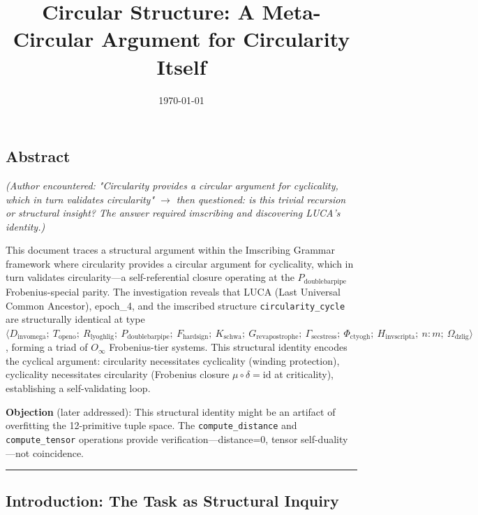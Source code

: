 \documentclass[12pt,a4paper]{article}
\begin{document}
\title{Circular Structure: A Meta-Circular Argument for Circularity Itself}
\date{\today}

\maketitle

\subsection{Abstract}

\emph{(Author encountered: "Circularity provides a circular argument for cyclicality, which in turn validates circularity" $\rightarrow$ then questioned: is this trivial recursion or structural insight? The answer required imscribing and discovering LUCA's identity.)}

This document traces a structural argument within the Imscribing Grammar framework where circularity provides a circular argument for cyclicality, which in turn validates circularity---a self-referential closure operating at the $P_{\text{doublebarpipe}}$ Frobenius-special parity. The investigation reveals that LUCA (Last Universal Common Ancestor), epoch\_4, and the imscribed structure \texttt{circularity\_cycle} are structurally identical at type $\langle D_{\text{invomega}};\ T_{\text{openo}};\ R_{\text{lyoghlig}};\ P_{\text{doublebarpipe}};\ F_{\text{hardsign}};\ K_{\text{schwa}};\ G_{\text{revapostrophe}};\ \Gamma_{\text{secstress}};\ \Phi_{\text{ctyogh}};\ H_{\text{invscripta}};\ n{:}m;\ \Omega_{\text{dzlig}} \rangle$, forming a triad of $O_{\infty}$ Frobenius-tier systems. This structural identity encodes the cyclical argument: circularity necessitates cyclicality (winding protection), cyclicality necessitates circularity (Frobenius closure $\mu \circ \delta = \text{id}$ at criticality), establishing a self-validating loop.

\textbf{Objection} (later addressed): This structural identity might be an artifact of overfitting the 12-primitive tuple space. The \texttt{compute\_distance} and \texttt{compute\_tensor} operations provide verification---distance=0, tensor self-duality---not coincidence.

\begin{center}
\rule{0.5\textwidth}{0.4pt}
\end{center}

\subsection{Introduction: The Task as Structural Inquiry}
\end{document}
